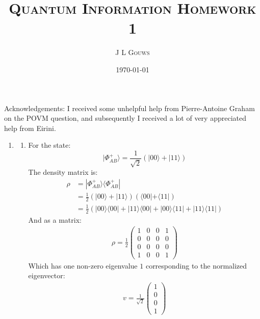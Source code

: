 \documentclass[12pt,a4]{article}
\title{
  \textsc{Quantum Information Homework 1}
}
\author{\textsc{J L Gouws}
}
\date{\today
\\[1cm]}
\begin{document}
\thispagestyle{empty}

\maketitle

Acknowledgements:
I received some unhelpful help from Pierre-Antoine Graham on the POVM question, and subsequently I received a lot of very appreciated help from Eirini.
\begin{enumerate}
  \item
    \begin{enumerate}
      \item
        For the state:
        \begin{equation*}
          |\Phi_{AB}^{+}\rangle = \frac{1}{\sqrt{2}}(| 00 \rangle + | 11 \rangle)
        \end{equation*}
        The density matrix is:
        \begin{align*}
          \rho &= |\Phi_{AB}^{+}\rangle\langle\Phi_{AB}^{+}|\\
               &= \frac{1}{2}(| 00 \rangle + | 11 \rangle)(\langle 00 | + \langle 11 |)\\
               &= \frac{1}{2}(| 00 \rangle \langle 00 | + | 11 \rangle \langle 00 | + | 00 \rangle \langle 11 | + | 11 \rangle \langle 11 |)
        \end{align*}
        And as a matrix:
        \begin{align*}
          \rho = 
            \frac{1}{2}
          \left(
          \begin{matrix}
            1 & 0 & 0 & 1\\
            0 & 0 & 0 & 0\\
            0 & 0 & 0 & 0\\
            1 & 0 & 0 & 1
          \end{matrix}
          \right)
        \end{align*}
        Which has one non-zero eigenvalue $1$ corresponding to the normalized eigenvector:
        \begin{align*}
             v = 
            \frac{1}{\sqrt{2}}
              \left(
              \begin{matrix}
                1 \\
                0 \\
                0 \\
                1 
              \end{matrix}
          \right)
        \end{align*}

\end{enumerate}
\end{enumerate}
\end{document}
